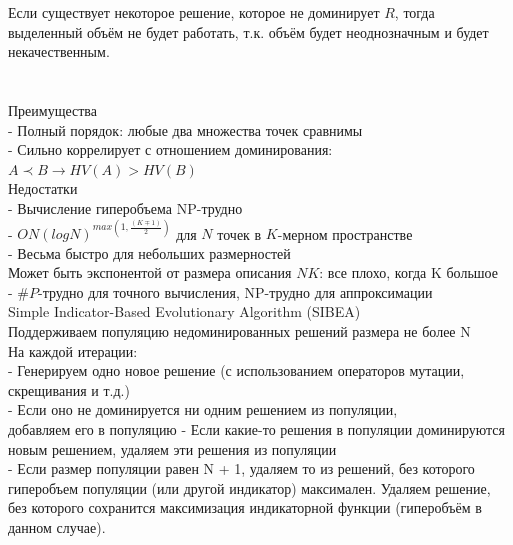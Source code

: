 Если существует некоторое решение, которое не доминирует $R$, тогда выделенный объём не будет работать, т.к. объём будет неоднозначным и будет некачественным.\\
\\
\\

Преимущества\\
- Полный порядок: любые два множества точек сравнимы\\
- Сильно коррелирует с отношением доминирования:
$A \prec B → HV(A) > HV(B)$\\

Недостатки\\
- Вычисление гиперобъема NP-трудно\\
- $O N(logN)^{max(1,\frac{(K \mp 1)}{2})}$ для $N$ точек в $K$-мерном пространстве\\
- Весьма быстро для небольших размерностей\\
Может быть экспонентой от размера описания $NK$: все плохо, когда K большое\\
- $\#P$-трудно для точного вычисления, NP-трудно для аппроксимации\\

Simple Indicator-Based Evolutionary Algorithm (SIBEA)\\
Поддерживаем популяцию недоминированных решений размера не более N\\
На каждой итерации:\\
- Генерируем одно новое решение (с использованием операторов
мутации, скрещивания и т.д.)\\
- Если оно не доминируется ни одним решением из популяции,\\
добавляем его в популяцию
- Если какие-то решения в популяции доминируются новым решением,
удаляем эти решения из популяции\\
- Если размер популяции равен N + 1, удаляем то из решений, без которого
гиперобъем популяции (или другой индикатор) максимален. Удаляем решение, без которого сохранится максимизация индикаторной функции (гиперобъём в данном случае).
